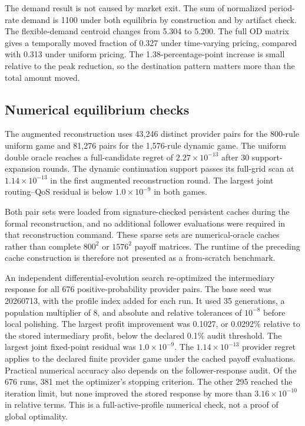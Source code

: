 \documentclass[11pt,a4paper]{article}
\begin{document}
The demand result is not caused by market exit. The sum of normalized period-rate demand is 1100 under both equilibria by construction and by artifact check. The flexible-demand centroid changes from 5.304 to 5.200. The full OD matrix gives a temporally moved fraction of 0.327 under time-varying pricing, compared with 0.313 under uniform pricing. The 1.38-percentage-point increase is small relative to the peak reduction, so the destination pattern matters more than the total amount moved.

\subsection{Numerical equilibrium checks}

The augmented reconstruction uses 43,246 distinct provider pairs for the 800-rule uniform game and 81,276 pairs for the 1,576-rule dynamic game. The uniform double oracle reaches a full-candidate regret of $2.27\times10^{-13}$ after 30 support-expansion rounds. The dynamic continuation support passes its full-grid scan at $1.14\times10^{-13}$ in the first augmented reconstruction round. The largest joint routing--QoS residual is below $1.0\times10^{-9}$ in both games.

Both pair sets were loaded from signature-checked persistent caches during the formal reconstruction, and no additional follower evaluations were required in that reconstruction command. These sparse sets are numerical-oracle caches rather than complete $800^2$ or $1576^2$ payoff matrices. The runtime of the preceding cache construction is therefore not presented as a from-scratch benchmark.

An independent differential-evolution search \cite{storn1997differential} re-optimized the intermediary response for all 676 positive-probability provider pairs. The base seed was 20260713, with the profile index added for each run. It used 35 generations, a population multiplier of 8, and absolute and relative tolerances of $10^{-8}$ before local polishing. The largest profit improvement was 0.1027, or 0.0292\% relative to the stored intermediary profit, below the declared 0.1\% audit threshold. The largest joint fixed-point residual was $1.0\times10^{-9}$. The $1.14\times10^{-13}$ provider regret applies to the declared finite provider game under the cached payoff evaluations. Practical numerical accuracy also depends on the follower-response audit. Of the 676 runs, 381 met the optimizer's stopping criterion. The other 295 reached the iteration limit, but none improved the stored response by more than $3.16\times10^{-10}$ in relative terms. This is a full-active-profile numerical check, not a proof of global optimality.
\end{document}
